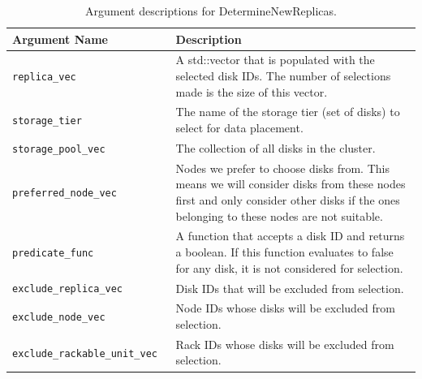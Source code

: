 \documentclass[12pt]{article}
\begin{document}
    \begin{table}
      \caption{Argument descriptions for DetermineNewReplicas.}
      \begin{tabular}{ | p{0.4\linewidth} | p{0.6\linewidth} | }
        \hline
        \textbf{Argument Name} & \textbf{Description} \\ \hline
        \verb|replica_vec| & A std::vector that is populated with the selected
                             disk IDs. The number of selections made is the
                             size of this vector. \\ \hline

        \verb|storage_tier| & The name of the storage tier (set of disks) to
                              select for data placement. \\ \hline
 
        \verb|storage_pool_vec| & The collection of all disks in the cluster.  \\ \hline

        \verb|preferred_node_vec| & Nodes we prefer to choose disks from. This
                                    means we will consider disks from these
                                    nodes first and only consider other disks
                                    if the ones belonging to these nodes are
                                    not suitable. \\ \hline

        \verb|predicate_func| & A function that accepts a disk ID and returns a
                                boolean. If this function evaluates to false
                                for any disk, it is not considered for
                                selection. \\ \hline

        \verb|exclude_replica_vec| & Disk IDs that will be excluded from
                                     selection. \\ \hline

        \verb|exclude_node_vec| & Node IDs whose disks will be excluded from
                                  selection. \\ \hline

        \verb|exclude_rackable_unit_vec| & Rack IDs whose disks will be
                                           excluded from selection. \\ \hline

        \hline
      \end{tabular}
    \end{table}
\end{document}

